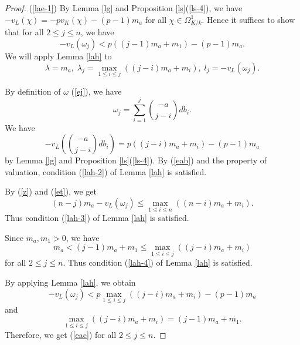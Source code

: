 \documentclass[sn-mathphys-num]{sn-jnl}
\numberwithin{equation}{section}
\theoremstyle{plain}
\theoremstyle{definition}
\begin{document}
\begin{proof}
  (\ref{lae-1}) By Lemma \ref{lg} and Proposition \ref{ls}(\ref{ls-4}), we have $-v_L(\chi)=-pv_K(\chi)-(p-1)m_a$ for all $\chi\in\Omega_{K/k}^1$. Hence it suffices to show that for all $2\leq j\leq n$, we have
  \begin{equation}\label{eac}
    -v_L(\omega_j)<p((j-1)m_a+m_1)-(p-1)m_a.
  \end{equation}
  We will apply Lemma \ref{lah} to
  \begin{equation}
  \lambda=m_a,\;\lambda_j=\max_{1\leq i\leq j}((j-i)m_a+m_{i}),\; l_j=-v_L(\omega_j).
  \end{equation}
  
  By definition of $\omega$ (\ref{ej}), we have
  \begin{equation}\label{eab}
  \omega_j=\sum_{i=1}^j\binom{-a}{j-i}db_i.
  \end{equation}
  We have
  \begin{equation}
    -v_L\left(\binom{-a}{j-i}db_i\right)=p((j-i)m_a+m_{i})-(p-1)m_a
  \end{equation}
   by Lemma \ref{lg} and Proposition \ref{ls}(\ref{ls-4}). By (\ref{eab}) and the property of valuation, condition (\ref{lah-2}) of Lemma \ref{lah} is satisfied.
  
  By (\ref{z}) and (\ref{et}), we get
  \begin{equation}
  (n-j)m_a-v_L(\omega_j)\leq\max_{1\leq i\leq n}((n-i)m_a+m_{i}).
  \end{equation}
  Thus condition (\ref{lah-3}) of Lemma \ref{lah} is satisfied.

  Since $m_a,m_1>0$, we have 
  \begin{equation}
  m_a<(j-1)m_a+m_1\leq\max_{1\leq i\leq j}((j-i)m_a+m_{i})
  \end{equation}
  for all $2\leq j\leq n$. Thus condition (\ref{lah-4}) of Lemma \ref{lah} is satisfied.

  By applying Lemma \ref{lah}, we obtain
  \begin{equation}
  -v_L(\omega_j)< p\max_{1\leq i\leq j}((j-i)m_a+m_i)-(p-1)m_a
  \end{equation}
  and 
  \begin{equation}
    \max_{1\leq i\leq j}((j-i)m_a+m_i)=(j-1)m_a+m_1.
  \end{equation}
  Therefore, we get (\ref{eac}) for all $2\leq j\leq n$.
  

\end{proof}
\end{document}
